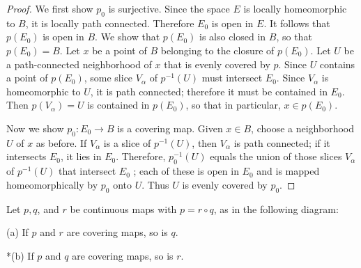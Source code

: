 \begin{proof}
	We first show \(p_{0}\) is surjective. Since the space \(E\) is locally homeomorphic to \(B\), it is locally path connected. Therefore \(E_{0}\) is open in \(E\). It follows that \(p( E_{0})\) is open in \(B\). We show that \(p( E_{0})\) is also closed in \(B\), so that \(p( E_{0}) = B\).
Let \(x\) be a point of \(B\) belonging to the closure of \(p( E_{0})\). Let \(U\) be a path-connected neighborhood of \(x\) that is evenly covered by \(p\). Since \(U\) contains a point of \(p( E_{0})\), some slice \(V_{\alpha }\) of \(p^{-1}( U)\) must intersect \(E_{0}\). Since \(V_{\alpha }\) is homeomorphic to \(U\), it is path connected; therefore it must be contained in \(E_{0}\). Then \(p( V_{\alpha }) = U\) is contained in \(p( E_{0})\), so that in particular, \(x \in p( E_{0})\).

Now we show \(p_{0} : E_{0} \rightarrow B\) is a covering map. Given \(x \in B\), choose a neighborhood \(U\) of \(x\) as before. If \(V_{\alpha }\) is a slice of \(p^{-1}( U)\), then \(V_{\alpha }\) is path connected; if it intersects \(E_{0}\), it lies in \(E_{0}\). Therefore, \(p_0^{-1}( U)\) equals the union of those slices \(V_{\alpha }\) of \(p^{-1}( U)\) that intersect \(E_{0}\) ; each of these is open in \(E_{0}\) and is mapped homeomorphically by \(p_{0}\) onto \(U\). Thus \(U\) is evenly covered by \(p_{0}\).
\end{proof}
\begin{lemma}
\label{lem:\thetheorem}
	Let \(p,q\), and \(r\) be continuous maps with \(p = r \circ q\), as in the following diagram:

\par\nopagebreak
\begin{center}
	\label{fig:com_80_1}
\end{center}
\par\nopagebreak 

(a) If \(p\) and \(r\) are covering maps, so is \(q\).

*(b) If \(p\) and \(q\) are covering maps, so is \(r\).
\end{lemma}

